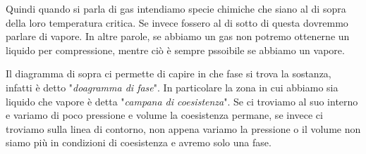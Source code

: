 \vspace{0.2cm}Quindi quando si parla di gas intendiamo specie chimiche che siano al di sopra della loro temperatura critica. Se invece fossero al di sotto di questa dovremmo parlare di vapore. In altre parole, se abbiamo un gas non potremo ottenerne un liquido per compressione, mentre ciò è sempre pssoibile se abbiamo un vapore.

\vspace{0.2cm} Il diagramma di sopra ci permette di capire in che fase si trova la sostanza, infatti è detto "\textit{doagramma di fase}". In particolare la zona in cui abbiamo sia liquido che vapore è detta "\textit{campana di coesistenza}". Se ci troviamo al suo interno e variamo di poco pressione e volume la coesistenza permane, se invece ci troviamo sulla linea di contorno, non appena variamo la pressione o il volume non siamo più in condizioni di coesistenza e avremo solo una fase.
